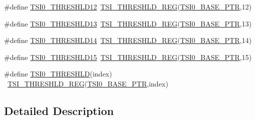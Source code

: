 \begin{DoxyCompactItemize}
\item 
\#define \hyperlink{group___t_s_i___register___accessor___macros_ga58648c5be7f546950da2b0b680ce5be2}{T\+S\+I0\+\_\+\+T\+H\+R\+E\+S\+H\+L\+D12}~\hyperlink{group___t_s_i___register___accessor___macros_gad487b889bf5ed9fc832ab15d8a6af91c}{T\+S\+I\+\_\+\+T\+H\+R\+E\+S\+H\+L\+D\+\_\+\+R\+EG}(\hyperlink{group___t_s_i___peripheral_gaf98ea1cd15559446e0cfc1ae177751f6}{T\+S\+I0\+\_\+\+B\+A\+S\+E\+\_\+\+P\+TR},12)
\item 
\#define \hyperlink{group___t_s_i___register___accessor___macros_ga10517c6546b38a0b3a412568b7ad1335}{T\+S\+I0\+\_\+\+T\+H\+R\+E\+S\+H\+L\+D13}~\hyperlink{group___t_s_i___register___accessor___macros_gad487b889bf5ed9fc832ab15d8a6af91c}{T\+S\+I\+\_\+\+T\+H\+R\+E\+S\+H\+L\+D\+\_\+\+R\+EG}(\hyperlink{group___t_s_i___peripheral_gaf98ea1cd15559446e0cfc1ae177751f6}{T\+S\+I0\+\_\+\+B\+A\+S\+E\+\_\+\+P\+TR},13)
\item 
\#define \hyperlink{group___t_s_i___register___accessor___macros_gaad652b44d37eb84d2dc43dff53280914}{T\+S\+I0\+\_\+\+T\+H\+R\+E\+S\+H\+L\+D14}~\hyperlink{group___t_s_i___register___accessor___macros_gad487b889bf5ed9fc832ab15d8a6af91c}{T\+S\+I\+\_\+\+T\+H\+R\+E\+S\+H\+L\+D\+\_\+\+R\+EG}(\hyperlink{group___t_s_i___peripheral_gaf98ea1cd15559446e0cfc1ae177751f6}{T\+S\+I0\+\_\+\+B\+A\+S\+E\+\_\+\+P\+TR},14)
\item 
\#define \hyperlink{group___t_s_i___register___accessor___macros_ga1fe2257d2fe4a63dd56d95a8e601e33d}{T\+S\+I0\+\_\+\+T\+H\+R\+E\+S\+H\+L\+D15}~\hyperlink{group___t_s_i___register___accessor___macros_gad487b889bf5ed9fc832ab15d8a6af91c}{T\+S\+I\+\_\+\+T\+H\+R\+E\+S\+H\+L\+D\+\_\+\+R\+EG}(\hyperlink{group___t_s_i___peripheral_gaf98ea1cd15559446e0cfc1ae177751f6}{T\+S\+I0\+\_\+\+B\+A\+S\+E\+\_\+\+P\+TR},15)
\item 
\#define \hyperlink{group___t_s_i___register___accessor___macros_ga0b612d5dbfc948ed9df57e3ef8bf4a6f}{T\+S\+I0\+\_\+\+T\+H\+R\+E\+S\+H\+LD}(index)                                      ~\hyperlink{group___t_s_i___register___accessor___macros_gad487b889bf5ed9fc832ab15d8a6af91c}{T\+S\+I\+\_\+\+T\+H\+R\+E\+S\+H\+L\+D\+\_\+\+R\+EG}(\hyperlink{group___t_s_i___peripheral_gaf98ea1cd15559446e0cfc1ae177751f6}{T\+S\+I0\+\_\+\+B\+A\+S\+E\+\_\+\+P\+TR},index)
\end{DoxyCompactItemize}


\subsection{Detailed Description}


